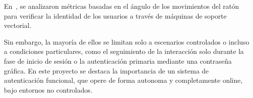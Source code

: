 En~\cite{Zheng2011}, se analizaron métricas basadas en el ángulo de los movimientos del ratón para verificar la identidad de los usuarios a través de máquinas de soporte vectorial.

Sin embargo, la mayoría de ellos se limitan solo a escenarios controlados o incluso a condiciones particulares, como el seguimiento de la interacción solo durante la fase de inicio de sesión o la autenticación primaria mediante una contraseña gráfica. En este proyecto se destaca la importancia de un sistema de autenticación funcional, que opere de forma autonoma y completamente online, bajo entornos no controlados.

